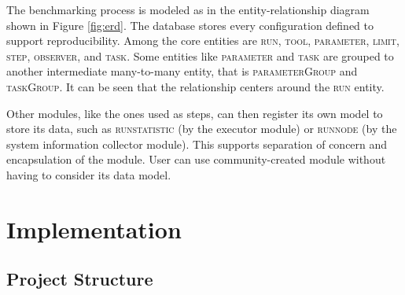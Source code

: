The benchmarking process is modeled as in the entity-relationship diagram \citep{chen1976entity} shown in Figure \ref{fig:erd}.
The database stores every configuration defined to support reproducibility.
Among the core entities are \textsc{run}, \textsc{tool}, \textsc{parameter}, \textsc{limit}, \textsc{step}, \textsc{observer}, and \textsc{task}.
Some entities like \textsc{parameter} and \textsc{task} are grouped to another intermediate many-to-many entity, that is \textsc{parameterGroup} and \textsc{taskGroup}.
It can be seen that the relationship centers around the \textsc{run} entity.

Other modules, like the ones used as steps, can then register its own model to store its data, such as \textsc{runstatistic} (by the executor module) or \textsc{runnode} (by the system information collector module).
This supports separation of concern and encapsulation of the module.
User can use community-created module without having to consider its data model.

\section{Implementation}
\label{sec:impl.impl}


\subsection{Project Structure}
\label{sec:impl.structure}

